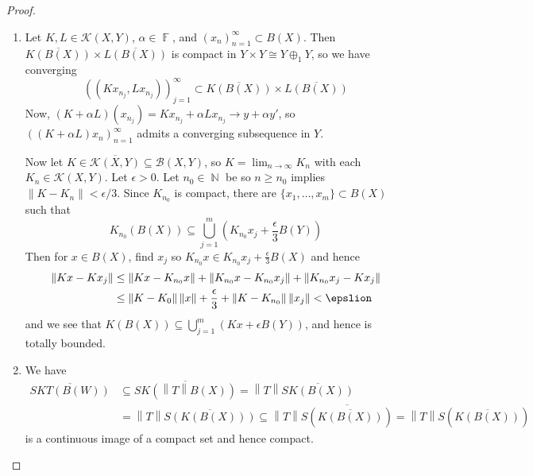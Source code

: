 \documentclass[11pt, a4paper]{memoir}
\DeclareMathOperator{\N}{{\mathbb{N}}}
\DeclareMathOperator{\F}{{\mathbb{F}}}
\newcommand{\norm}[1]{\ensuremath{\left\lVert#1\right\rVert}}
\theoremstyle{change}
\theoremstyle{plain}
\theoremstyle{nonumberplain}
\newtheorem{proof}{Proof}
\numberwithin{equation}{section}
\begin{document}
\begin{proof}
    \begin{enumerate}[nl,r]
        \item Let $K,L\in\mathcal{K}(X,Y)$, $\alpha\in\F$, and $(x_n)_{n=1}^\infty\subset B(X)$.
            Then $\overline{K(B(X))}\times\overline{L(B(X))}$ is compact in $Y\times Y\cong Y\oplus_1 Y$, so we have converging
            \begin{equation*}
                \left(\left(Kx_{n_j},Lx_{n_j}\right)\right)_{j=1}^\infty\subset\overline{K(B(X))}\times\overline{L(B(X))}
            \end{equation*}
            Now, $(K+\alpha L)(x_{n_j})=Kx_{n_j}+\alpha Lx_{n_j}\to y+\alpha y'$, so $((K+\alpha L)x_n)_{n=1}^\infty$ admits a converging subsequence in $Y$.
            
            Now let $K\in\overline{\mathcal{K}(X,Y)}\subseteq\mathcal{B}(X,Y)$, so $K=\lim_{n\to\infty}K_n$ with each $K_n\in\mathcal{K}(X,Y)$.
            Let $\epsilon>0$.
            Let $n_0\in\N$ be so $n\geq n_0$ implies $\norm{K-K_n}<\epsilon/3$.
            Since $K_{n_0}$ is compact, there are $\{x_1,\ldots,x_m\}\subset B(X)$ such that
            \begin{equation*}
                K_{n_0}(B(X))\subseteq\bigcup_{j=1}^m(K_{n_0}x_j+\frac{\epsilon}{3}B(Y))
            \end{equation*}
            Then for $x\in B(X)$, find $x_j$ so $K_{n_0}x\in K_{n_0}x_j+\frac{\epsilon}{3}B(X)$ and hence
            \begin{align*}
                \norm{Kx-Kx_j}&\leq\norm{Kx-K_{n_0}x}+\norm{K_{n_0}x-K_{n_0}x_j}+\norm{K_{n_0}x_j-Kx_j}\\
                              &\leq \norm{K-K_0}\norm{x}+\frac{\epsilon}{3}+\norm{K-K_{n_0}}\norm{x_j}<\epslion
            \end{align*}
            and we see that $K(B(X))\subseteq\bigcup_{j=1}^m(Kx+\epsilon B(Y))$, and hence is totally bounded.
        \item We have
            \begin{align*}
                \overline{SKT(B(W))}&\subseteq\overline{SK(\norm{T}B(X))}=\norm{T}\overline{SK(B(X))}\\
                                    &=\norm{T}\overline{S(K(B(X)))}\subseteq\norm{T}\overline{S(\overline{K(B(X))})}=\norm{T}S(\overline{K(B(X))})
            \end{align*}
            is a continuous image of a compact set and hence compact.
    \end{enumerate}
\end{proof}
\end{document}
